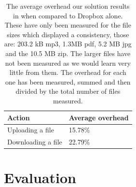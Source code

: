 \documentclass[12pt, titlepage]{article}
\begin{document}
\begin{table}[h]
	\begin{center}
    	\begin{tabular}{ | l | l |}
    \hline
     \textbf{Action} & \textbf{Average overhead} \\ \hline
      Uploading a file & 15.78\% \\ \hline
      Downloading a file & 22.79\%	\\ \hline    
    \end{tabular}
    \caption{The average overhead our solution results in when compared to Dropbox alone. These have only been measured for the file sizes which displayed a consistency, those are: 203.2 kB mp3, 1.3MB pdf, 5.2 MB jpg and the 10.5 MB zip. The larger files have not been measured as we would learn very little from them. The overhead for each one has been measured, summed and then divided by the total number of files measured.}
    \label{tab:overhead}
   \end{center}
\end{table}


\section{Evaluation}
\end{document}
